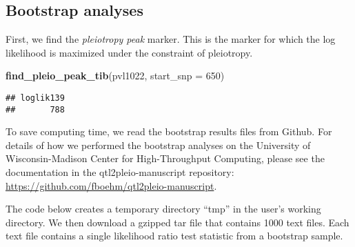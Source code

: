 \documentclass[oneside]{book}
\newenvironment{Shaded}{\begin{snugshade}}{\end{snugshade}}
\newcommand{\DataTypeTok}[1]{\textcolor[rgb]{0.13,0.29,0.53}{#1}}
\newcommand{\DecValTok}[1]{\textcolor[rgb]{0.00,0.00,0.81}{#1}}
\newcommand{\KeywordTok}[1]{\textcolor[rgb]{0.13,0.29,0.53}{\textbf{#1}}}
\newcommand{\NormalTok}[1]{#1}
\begin{document}
\hypertarget{bootstrap-analyses}{%
\subsection{Bootstrap analyses}\label{bootstrap-analyses}}

First, we find the \emph{pleiotropy peak} marker. This is the marker for
which the log likelihood is maximized under the constraint of
pleiotropy.

\begin{Shaded}
\begin{Highlighting}[]
\KeywordTok{find_pleio_peak_tib}\NormalTok{(pvl1022, }\DataTypeTok{start_snp =} \DecValTok{650}\NormalTok{)}
\end{Highlighting}
\end{Shaded}

\begin{verbatim}
## loglik139 
##       788
\end{verbatim}

To save computing time, we read the bootstrap results files from Github.
For details of how we performed the bootstrap analyses on the University
of Wisconsin-Madison Center for High-Throughput Computing, please see
the documentation in the qtl2pleio-manuscript repository:
\url{https://github.com/fboehm/qtl2pleio-manuscript}.

The code below creates a temporary directory ``tmp'' in the user's
working directory. We then download a gzipped tar file that contains
1000 text files. Each text file contains a single likelihood ratio test
statistic from a bootstrap sample.
\end{document}
